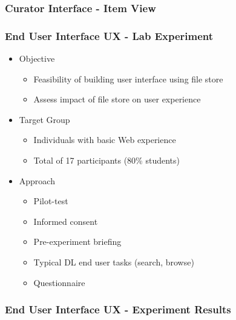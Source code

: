 \documentclass[xcolor=dvitex,t,11pt]{beamer}
\begin{document}
\begin{frame}[fragile]
\frametitle{Curator Interface - Item View}
\begin{figure}
\centering
{}
\end{figure}
\end{frame}

\begin{frame}[fragile]
\frametitle{End User Interface UX - Lab Experiment}
\begin{itemize}
\item<1-> Objective
\begin{itemize}
\item<2-> Feasibility of building user interface using file store
\item<3-> Assess impact of file store on user experience
\end{itemize}
\item<4-> Target Group
\begin{itemize}
\item<5-> Individuals with basic Web experience
\item<6-> Total of 17 participants (80\% students)
\end{itemize}
\item<7-> Approach
\begin{itemize}
\item<8-> Pilot-test
\item<9-> Informed consent
\item<10-> Pre-experiment briefing
\item<11-> Typical DL end user tasks (search, browse)
\item<12-> Questionnaire
\end{itemize}
\end{itemize}
\end{frame}


\begin{frame}[fragile]
\frametitle{End User Interface UX - Experiment Results}
\centering

\end{frame}
\end{document}
